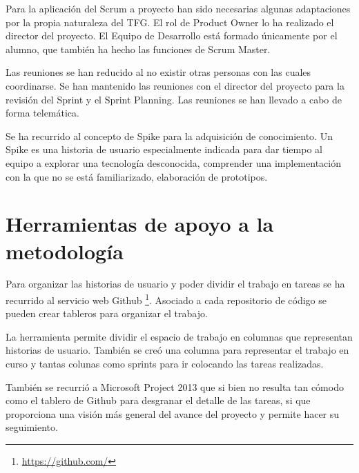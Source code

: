 Para la aplicación del Scrum a proyecto han sido necesarias algunas adaptaciones por la propia naturaleza del TFG. El rol de Product Owner lo ha realizado el director del proyecto. El Equipo de Desarrollo está formado únicamente por el alumno, que también ha hecho las funciones de Scrum Master.

Las reuniones se han reducido al no existir otras personas con las cuales coordinarse. Se han mantenido las reuniones con el director del proyecto para la revisión del Sprint y el Sprint Planning. Las reuniones se han llevado a cabo de forma telemática.

Se ha recurrido al concepto de Spike para la adquisición de conocimiento. Un Spike es una historia de usuario especialmente indicada para dar tiempo al equipo a explorar una tecnología desconocida, comprender una implementación con la que no se está familiarizado, elaboración de prototipos.

\section{Herramientas de apoyo a la metodología}

Para organizar las historias de usuario y poder dividir el trabajo en tareas se ha recurrido al servicio web Github \footnote{\url{https://github.com/}}. Asociado a cada repositorio de código se pueden crear tableros para organizar el trabajo.

La herramienta permite dividir el espacio de trabajo en columnas que representan historias de usuario. También se creó una columna para representar el trabajo en curso y tantas colunas como sprints para ir colocando las tareas realizadas.

También se recurrió a Microsoft Project 2013 que si bien no resulta tan cómodo como el tablero de Github para desgranar el detalle de las tareas, si que proporciona una visión más general del avance del proyecto y permite hacer su seguimiento.
